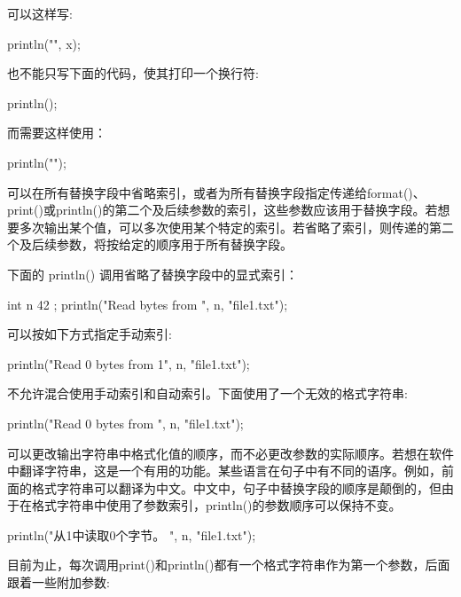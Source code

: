 可以这样写:

\begin{cpp}
println("{}", x);
\end{cpp}

也不能只写下面的代码，使其打印一个换行符:

\begin{cpp}
println();
\end{cpp}

而需要这样使用：

\begin{cpp}
println("");
\end{cpp}


可以在所有替换字段中省略索引，或者为所有替换字段指定传递给format()、print()或println()的第二个及后续参数的索引，这些参数应该用于替换字段。若想要多次输出某个值，可以多次使用某个特定的索引。若省略了索引，则传递的第二个及后续参数，将按给定的顺序用于所有替换字段。

下面的 println() 调用省略了替换字段中的显式索引：

\begin{cpp}
int n { 42 };
println("Read {} bytes from {}", n, "file1.txt");
\end{cpp}

可以按如下方式指定手动索引:

\begin{cpp}
println("Read {0} bytes from {1}", n, "file1.txt");
\end{cpp}

不允许混合使用手动索引和自动索引。下面使用了一个无效的格式字符串:

\begin{cpp}
println("Read {0} bytes from {}", n, "file1.txt");
\end{cpp}

可以更改输出字符串中格式化值的顺序，而不必更改参数的实际顺序。若想在软件中翻译字符串，这是一个有用的功能。某些语言在句子中有不同的语序。例如，前面的格式字符串可以翻译为中文。中文中，句子中替换字段的顺序是颠倒的，但由于在格式字符串中使用了参数索引，println()的参数顺序可以保持不变。

\begin{cpp}
println("从{1}中读取{0}个字节。 ", n, "file1.txt");
\end{cpp}


目前为止，每次调用print()和println()都有一个格式字符串作为第一个参数，后面跟着一些附加参数:

